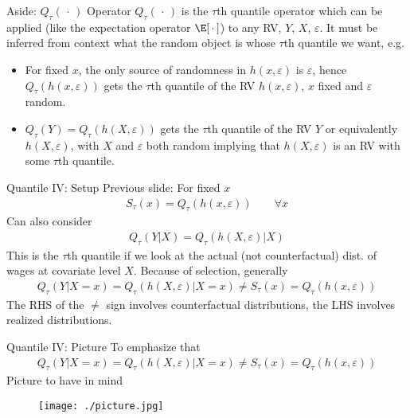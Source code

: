\documentclass[handout]{beamer}
\begin{document}
\begin{frame}[shrink]{Aside: $Q_\tau(\,\cdot\,)$ Operator}
$Q_\tau(\,\cdot\,)$ is the $\tau$th quantile operator which can be
applied (like the expectation operator $\E[\,\cdot\,]$) to any RV,
$Y$, $X$, $\varepsilon$.
It must be inferred from context what the random object is
whose $\tau$th quantile we want, e.g.
\begin{itemize}
  \item For fixed $x$, the only source of randomness in
    $h(x,\varepsilon)$ is $\varepsilon$, hence
    $Q_\tau(h(x,\varepsilon))$ gets the $\tau$th quantile of the RV
    $h(x,\varepsilon)$, $x$ fixed and $\varepsilon$ random.
  \item
    $Q_\tau(Y)=Q_\tau(h(X,\varepsilon))$ gets the $\tau$th quantile of
    the RV $Y$ or equivalently $h(X,\varepsilon)$, with $X$ and
    $\varepsilon$ both random implying that $h(X,\varepsilon)$ is an RV
    with some $\tau$th quantile.
\end{itemize}
\end{frame}



\begin{frame}[shrink]{Quantile IV: Setup}
Previous slide:
For fixed $x$
\begin{align*}
  S_\tau(x) = Q_\tau(h(x,\varepsilon))
  \qquad
  \forall x
\end{align*}
Can also consider
\begin{align*}
  Q_\tau(Y|X)
  =
  Q_\tau(h(X,\varepsilon)|X)
\end{align*}
This is the $\tau$th quantile if we look at the \alert{actual} (not
counterfactual) dist. of wages at covariate level $X$.
Because of selection, generally
\begin{align*}
  Q_\tau(Y|X=x)
  =
  Q_\tau(h(X,\varepsilon)|X=x)
  \neq
  S_\tau(x) = Q_\tau(h(x,\varepsilon))
\end{align*}
The RHS of the $\neq$ sign involves counterfactual distributions, the
LHS involves realized distributions.
\end{frame}


\begin{frame}[shrink]{Quantile IV: Picture}
To emphasize that
\begin{align*}
  Q_\tau(Y|X=x)
  =
  Q_\tau(h(X,\varepsilon)|X=x)
  \neq
  S_\tau(x) = Q_\tau(h(x,\varepsilon))
\end{align*}
Picture to have in mind
\begin{figure}
  \texttt{[image: ./picture.jpg]}
\end{figure}
\end{frame}
\end{document}
